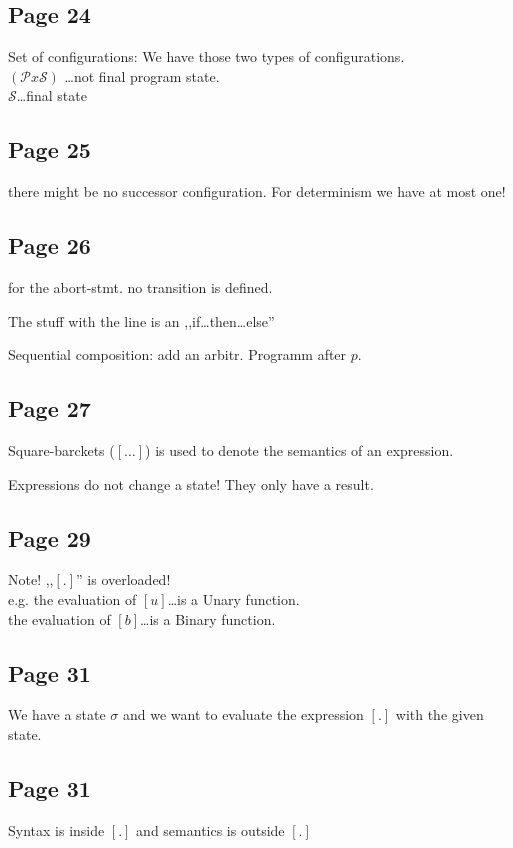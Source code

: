 \documentclass[a4paper]{article}
\begin{document}
\subsection{Page 24}
Set of configurations: We have those two types of configurations.\\
$(\mathcal{P} x \mathcal{S})$ \ldots not final program state.\\
$\mathcal{S}$\ldots final state



\subsection{Page 25} there might be no successor configuration. For determinism
we have at most one!

\subsection{Page 26} for the abort-stmt. no transition is defined.

The stuff with the line is an ,,if\ldots then\ldots else''

Sequential composition: add an arbitr. Programm after $p$.

\subsection{Page 27}
Square-barckets ($[\ldots]$) is used to denote the semantics of an expression.

Expressions do not change a state! They only have a result.


\subsection{Page 29} Note! ,,$[.]$'' is overloaded!\\
e.g. the evaluation of $[u]$\ldots is a Unary function.\\
the evaluation of $[b]$\ldots is a Binary function.\\

\subsection{Page 31}
We have a state $\sigma$ and we want to evaluate the expression $[.]$ with
the given state.


\subsection{Page 31}
Syntax is inside $[.]$ and semantics is outside $[.]$
\end{document}
